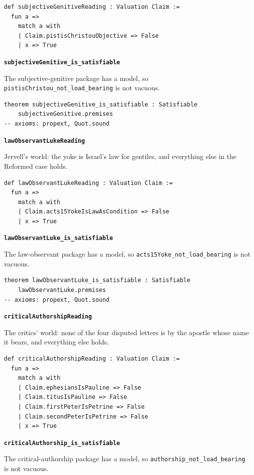 \documentclass[11pt]{article}
\begin{document}
{\small\begin{verbatim}
def subjectiveGenitiveReading : Valuation Claim :=
  fun a =>
    match a with
    | Claim.pistisChristouObjective => False
    | x => True
\end{verbatim}}
\par\medskip\noindent\textbf{\texttt{subjective\allowbreak{}Genitive\_\allowbreak{}is\_\allowbreak{}satisfiable}}\par\nobreak\noindent
The subjective-genitive package has a model, so \texttt{pistis\allowbreak{}Christou\_\allowbreak{}not\_\allowbreak{}load\_\allowbreak{}bearing} is not vacuous.

{\small\begin{verbatim}
theorem subjectiveGenitive_is_satisfiable : Satisfiable
    subjectiveGenitive.premises
-- axioms: propext, Quot.sound
\end{verbatim}}
\par\medskip\noindent\textbf{\texttt{law\allowbreak{}Observant\allowbreak{}Luke\allowbreak{}Reading}}\par\nobreak\noindent
Jervell's world: the yoke is Israel's law for gentiles, and everything else in the Reformed case holds.

{\small\begin{verbatim}
def lawObservantLukeReading : Valuation Claim :=
  fun a =>
    match a with
    | Claim.acts15YokeIsLawAsCondition => False
    | x => True
\end{verbatim}}
\par\medskip\noindent\textbf{\texttt{law\allowbreak{}Observant\allowbreak{}Luke\_\allowbreak{}is\_\allowbreak{}satisfiable}}\par\nobreak\noindent
The law-observant package has a model, so \texttt{acts15\allowbreak{}Yoke\_\allowbreak{}not\_\allowbreak{}load\_\allowbreak{}bearing} is not vacuous.

{\small\begin{verbatim}
theorem lawObservantLuke_is_satisfiable : Satisfiable
    lawObservantLuke.premises
-- axioms: propext, Quot.sound
\end{verbatim}}
\par\medskip\noindent\textbf{\texttt{critical\allowbreak{}Authorship\allowbreak{}Reading}}\par\nobreak\noindent
The critics' world: none of the four disputed letters is by the apostle whose name it bears, and everything else holds.

{\small\begin{verbatim}
def criticalAuthorshipReading : Valuation Claim :=
  fun a =>
    match a with
    | Claim.ephesiansIsPauline => False
    | Claim.titusIsPauline => False
    | Claim.firstPeterIsPetrine => False
    | Claim.secondPeterIsPetrine => False
    | x => True
\end{verbatim}}
\par\medskip\noindent\textbf{\texttt{critical\allowbreak{}Authorship\_\allowbreak{}is\_\allowbreak{}satisfiable}}\par\nobreak\noindent
The critical-authorship package has a model, so \texttt{authorship\_\allowbreak{}not\_\allowbreak{}load\_\allowbreak{}bearing} is not vacuous.
\end{document}
